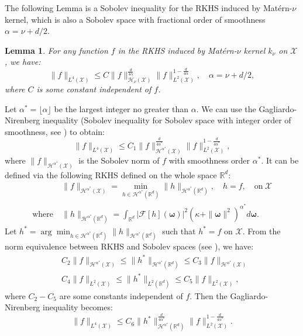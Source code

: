 \documentclass[aos,preprint]{imsart}
\theoremstyle{plain}
\newtheorem{lemma}[theorem]{Lemma}
\newcommand{\Real}{\mathbb R}
\newcommand{\CalH}{\mathcal H}
\newcommand{\CalX}{\mathcal X}
\newcommand{\CalF}{\mathcal{F}}
\newcommand{\Bomega}{\boldsymbol{\omega}}
\theoremstyle{remark}
\begin{document}
\begin{appendix}
The following Lemma is a Sobolev inequality for the RKHS induced by Mat\'ern-$\nu$ kernel, which is also a Sobolev space with fractional order of smoothness $\alpha=\nu+d/2$.
\begin{lemma}
    \label{lem:RKHS_interpolation inequality}
    For any function $f$ in the RKHS induced by Mat\'ern-$\nu$ kernel $k_\nu$ on $\CalX$, we have:
    \[\|f\|_{L^4(\CalX)}\leq C\|f\|_{\CalH_\nu(\CalX)}^{\frac{d}{4\alpha}}\|f\|_{L^2(\CalX)}^{1-\frac{d}{4\alpha}},\quad \alpha=\nu+d/2,\]
    where $C$ is some constant independent of $f$.
\end{lemma}
\proof
Let $\alpha^*=\lfloor\alpha\rfloor$ be the largest integer no greater than $\alpha$. We can use the Gagliardo-Nirenberg inequality (Sobolev inequality for Sobolev space with integer order of smoothness, see \cite{nirenberg1959elliptic,gagliardo1959ulteriori}) to obtain:
\[\|f\|_{L^4(\CalX)}\leq C_1  \|f\|_{\CalH^{\alpha^*}(\CalX)}^{\frac{d}{4\alpha^*}}\|f\|_{L^2(\CalX)}^{1-\frac{d}{4\alpha^*}},\]
where  $\|f\|_{\CalH^{\alpha^*}(\CalX)}$ is the Sobolev norm of $f$ with smoothness order $\alpha^*$. It  can be defined via the following RKHS defined on the whole space $\Real^d$:
\begin{align*}
    &\|f\|_{\CalH^{\alpha^*}(\CalX)}=\min_{h\in\CalH^{\alpha^*}(\Real^d)}\|h\|_{\CalH^{\alpha^*}(\Real^d)},\quad h=f,\quad \text{on}\ \CalX\\
    \text{where}\ &\|h\|_{\CalH^{\alpha^*}(\Real^d)}=\int_{\Real^d}\left|\CalF[h](\Bomega)\right|^2(\kappa+\|\Bomega\|^2)^{\alpha^*} d\Bomega.
\end{align*}
Let $h^*=\arg \min_{h\in\CalH^{\alpha^*}(\Real^d)}\|h\|_{\CalH^{\alpha^*}(\Real^d)}$ such that $h^*=f$ on $\CalX$. From the norm equivalence between RKHS and Sobolev spaces (see \cite{Wendland10,Evans15}), we have:
\begin{align*}
    &C_2\|f\|_{{\CalH^{\alpha^*}(\CalX)}}\leq  \|h^*\|_{\CalH^{\alpha^*}(\Real^d)} \leq C_3\|f\|_{{\CalH^{\alpha^*}(\CalX)}}\\
    &C_4\|f\|_{{L^2(\CalX)}}\leq  \|h^*\|_{L^2(\Real^d)} \leq C_5\|f\|_{{L^2(\CalX)}},
\end{align*}
where $C_2-C_5$ are some constants independent of $f$. Then the Gagliardo-Nirenberg inequality becomes:
\begin{equation}
    \|f\|_{L^4(\CalX)}\leq C_6  \|h^*\|_{\CalH^{\alpha^*}(\Real^d)}^{\frac{d}{4\alpha^*}}\|f\|_{L^2(\CalX)}^{1-\frac{d}{4\alpha^*}}.\label{eq:RKHS_interpolation_inequality_1}
\end{equation}

\end{appendix}
\end{document}
